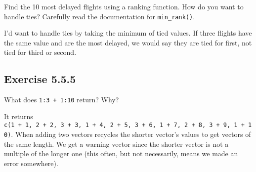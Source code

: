 \documentclass[]{book}
\newenvironment{Shaded}{\begin{snugshade}}{\end{snugshade}}
\newcommand{\CommentTok}[1]{\textcolor[rgb]{0.56,0.35,0.01}{\textit{#1}}}
\newcommand{\DataTypeTok}[1]{\textcolor[rgb]{0.13,0.29,0.53}{#1}}
\newcommand{\DecValTok}[1]{\textcolor[rgb]{0.00,0.00,0.81}{#1}}
\newcommand{\KeywordTok}[1]{\textcolor[rgb]{0.13,0.29,0.53}{\textbf{#1}}}
\newcommand{\NormalTok}[1]{#1}
\newcommand{\OperatorTok}[1]{\textcolor[rgb]{0.81,0.36,0.00}{\textbf{#1}}}
\newcommand{\StringTok}[1]{\textcolor[rgb]{0.31,0.60,0.02}{#1}}
\theoremstyle{plain}
\theoremstyle{remark}
\theoremstyle{definition}
\theoremstyle{definition}
\theoremstyle{definition}
\theoremstyle{remark}
\begin{document}
Find the 10 most delayed flights using a ranking function. How do you
want to handle ties? Carefully read the documentation for
\texttt{min\_rank()}.

I'd want to handle ties by taking the minimum of tied values. If three
flights have the same value and are the most delayed, we would say they
are tied for first, not tied for third or second.

\begin{Shaded}
\end{Shaded}

\hypertarget{exercise-5.5.5}{%
\subsection*{\texorpdfstring{Exercise
{5.5.5}}{Exercise 5.5.5}}\label{exercise-5.5.5}}

What does \texttt{1:3\ +\ 1:10} return? Why?

It returns
\texttt{c(1\ +\ 1,\ 2\ +\ 2,\ 3\ +\ 3,\ 1\ +\ 4,\ 2\ +\ 5,\ 3\ +\ 6,\ 1\ +\ 7,\ 2\ +\ 8,\ 3\ +\ 9,\ 1\ +\ 10)}.
When adding two vectors recycles the shorter vector's values to get
vectors of the same length. We get a warning vector since the shorter
vector is not a multiple of the longer one (this often, but not
necessarily, means we made an error somewhere).
\end{document}
